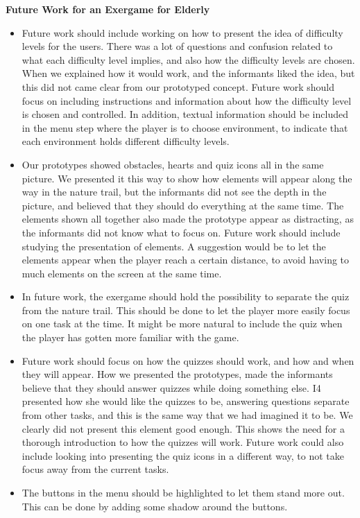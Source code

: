 \textbf{Future Work for an Exergame for Elderly}
\begin{itemize}
\renewcommand{\labelitemi}{$\bullet$}
\item Future work should include working on how to present the idea of difficulty levels for the users. There was a lot of questions and confusion related to what each difficulty level implies, and also how the difficulty levels are chosen. When we explained how it would work, and the informants liked the idea, but this did not came clear from our prototyped concept. Future work should focus on including instructions and information about how the difficulty level is chosen and controlled. In addition, textual information should be included in the menu step where the player is to choose environment, to indicate that each environment holds different difficulty levels.  
\item Our prototypes showed obstacles, hearts and quiz icons all in the same picture. We presented it this way to show how elements will appear along the way in the nature trail, but the informants did not see the depth in the picture, and believed that they should do everything at the same time. The elements shown all together also made the prototype appear as distracting, as the informants did not know what to focus on. Future work should include studying the presentation of elements. A suggestion would be to let the elements appear when the player reach a certain distance, to avoid having to much elements on the screen at the same time.
\item In future work, the exergame should hold the possibility to separate the quiz from the nature trail. This should be done to let the player more easily focus on one task at the time. It might be more natural to include the quiz when the player has gotten more familiar with the game.
\item Future work should focus on how the quizzes should work, and how and when they will appear. How we presented the prototypes, made the informants believe that they should answer quizzes while doing something else. I4 presented how she would like the quizzes to be, answering questions separate from other tasks, and this is the same way that we had imagined it to be. We clearly did not present this element good enough. This shows the need for a thorough introduction to how the quizzes will work. Future work could also include looking into presenting the quiz icons in a different way, to not take focus away from the current tasks. 
\item The buttons in the menu should be highlighted to let them stand more out. This can be done by adding some shadow around the buttons.

\end{itemize}
